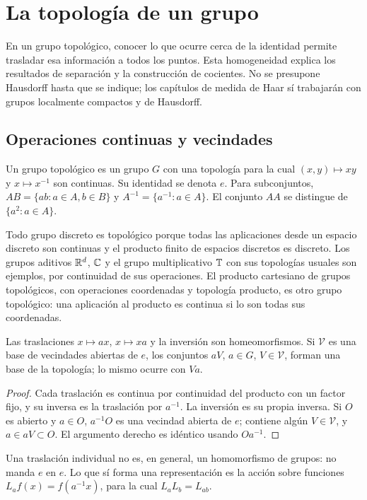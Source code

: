 \chapter{La topología de un grupo}\label{cap:v4-09}
En un grupo topológico, conocer lo que ocurre cerca de la identidad permite trasladar esa información a todos los puntos. Esta homogeneidad explica los resultados de separación y la construcción de cocientes. No se presupone Hausdorff hasta que se indique; los capítulos de medida de Haar sí trabajarán con grupos localmente compactos y de Hausdorff.

\section{Operaciones continuas y vecindades}\label{lectura:v4-15}
\begin{definicion}
Un grupo topológico es un grupo $G$ con una topología para la cual $(x,y)\mapsto xy$ y $x\mapsto x^{-1}$ son continuas. Su identidad se denota $e$. Para subconjuntos, $AB=\{ab:a\in A,b\in B\}$ y $A^{-1}=\{a^{-1}:a\in A\}$. El conjunto $AA$ se distingue de $\{a^2:a\in A\}$.
\end{definicion}
Todo grupo discreto es topológico porque todas las aplicaciones desde un espacio discreto son continuas y el producto finito de espacios discretos es discreto. Los grupos aditivos $\mathbb R^d$, $\mathbb C$ y el grupo multiplicativo $\mathbb T$ con sus topologías usuales son ejemplos, por continuidad de sus operaciones. El producto cartesiano de grupos topológicos, con operaciones coordenadas y topología producto, es otro grupo topológico: una aplicación al producto es continua si lo son todas sus coordenadas.
\begin{proposicion}
Las traslaciones $x\mapsto ax$, $x\mapsto xa$ y la inversión son homeomorfismos. Si $\mathcal V$ es una base de vecindades abiertas de $e$, los conjuntos $aV$, $a\in G$, $V\in\mathcal V$, forman una base de la topología; lo mismo ocurre con $Va$.
\end{proposicion}
\begin{proof}
Cada traslación es continua por continuidad del producto con un factor fijo, y su inversa es la traslación por $a^{-1}$. La inversión es su propia inversa. Si $O$ es abierto y $a\in O$, $a^{-1}O$ es una vecindad abierta de $e$; contiene algún $V\in\mathcal V$, y $a\in aV\subset O$. El argumento derecho es idéntico usando $Oa^{-1}$.
\end{proof}
Una traslación individual no es, en general, un homomorfismo de grupos: no manda $e$ en $e$. Lo que sí forma una representación es la acción sobre funciones $L_af(x)=f(a^{-1}x)$, para la cual $L_aL_b=L_{ab}$.
